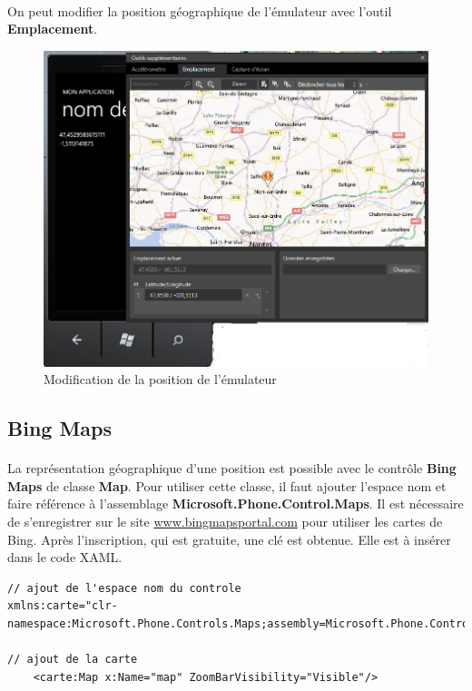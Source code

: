 \documentclass[twoside,UTF8]{EPURapport}
\begin{document}
\paragraph{}	
On peut modifier la position géographique de l'émulateur avec l'outil \textbf{Emplacement}. 

\begin{figure}[H]
	\center
	\includegraphics[scale=0.7]{images/geolocalisation.png}
	\caption{Modification de la position de l'émulateur}
\end{figure}
	
	
		\subsection{Bing Maps}
		
\paragraph{}
La représentation géographique d'une position est possible avec le contrôle \textbf{Bing Maps} de classe \textbf{Map}. Pour utiliser cette classe, il faut ajouter l'espace nom et faire référence à l'assemblage \textbf{Microsoft.Phone.Control.Maps}. Il est nécessaire de s'enregistrer sur le site \url{www.bingmapsportal.com} pour utiliser les cartes de Bing. Après l'inscription, qui est gratuite, une clé est obtenue. Elle est à insérer dans le code XAML. 

\begin{lstlisting}[caption={Utilisation de la carte avec le contrôle \textbf{Bing Maps}}]
// ajout de l'espace nom du controle
xmlns:carte="clr-namespace:Microsoft.Phone.Controls.Maps;assembly=Microsoft.Phone.Controls.Maps"	
	
// ajout de la carte	
	<carte:Map x:Name="map" ZoomBarVisibility="Visible"/>
\end{lstlisting}
\end{document}
